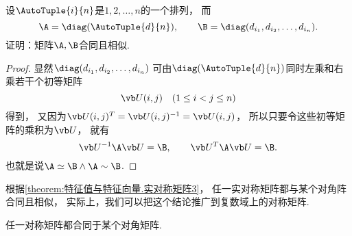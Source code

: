 \begin{example}
设\(\AutoTuple{i}{n}\)是\(1,2,\dotsc,n\)的一个排列，
而\[
	\A=\diag(\AutoTuple{d}{n}),
	\qquad
	\B=\diag(d_{i_1},d_{i_2},\dotsc,d_{i_n}).
\]
证明：矩阵\(\A,\B\)合同且相似.
\begin{proof}
显然\(\diag(d_{i_1},d_{i_2},\dotsc,d_{i_n})\)
可由\(\diag(\AutoTuple{d}{n})\)同时左乘和右乘若干个初等矩阵\[
	\P(i,j) \quad(1 \leq i < j \leq n)
\]得到，
又因为\(\P(i,j)^T = \P(i,j)^{-1} = \P(i,j)\)，
所以只要令这些初等矩阵的乘积为\(\P\)，
就有\[
	\P^{-1} \A \P = \B,
	\qquad
	\P^T \A \P = \B.
\]
也就是说\(\A\simeq\B\land\A\sim\B\).
\end{proof}
\end{example}

根据\cref{theorem:特征值与特征向量.实对称矩阵3}，
任一实对称矩阵都与某个对角阵合同且相似，
实际上，我们可以把这个结论推广到复数域上的对称矩阵.
\begin{theorem}
任一对称矩阵都合同于某个对角矩阵.
\end{theorem}
